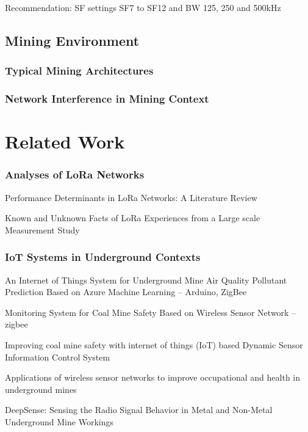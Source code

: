 \documentclass[a4paper,twoside,12pt]{report}
\begin{document}
Recommendation: SF settings SF7 to SF12 and BW 125, 250 and 500kHz \cite{SemtechDatasheet}

\subsection{Mining Environment}
\subsubsection{Typical Mining Architectures}
\subsubsection{Network Interference in Mining Context}

\section{Related Work}

\subsubsection{Analyses of LoRa Networks}
Performance Determinants in LoRa Networks: A Literature Review \cite{Gkotsiopoulos2021PerformanceReview}

Known and Unknown Facts of LoRa Experiences from a Large scale Measurement Study \cite{Liando2019KnownStudy}

\subsubsection{IoT Systems in Underground Contexts}

An Internet of Things System for Underground Mine Air Quality Pollutant Prediction Based on Azure Machine Learning \cite{Jo_Khan_2018} -- Arduino, ZigBee

Monitoring System for Coal Mine Safety Based on Wireless Sensor Network \cite{Zhu2019MonitoringNetwork} -- zigbee

Improving coal mine safety with internet of things (IoT) based Dynamic Sensor Information Control System \cite{Ali2022ImprovingSystem} 

Applications of wireless sensor networks to improve occupational and health in underground mines \cite{Sadeghi2022ApplicationsMines}

DeepSense: Sensing the Radio Signal Behavior in Metal and Non-Metal Underground Mine Workings \cite{Ranjan2018DeepSense:Workings}
\end{document}
